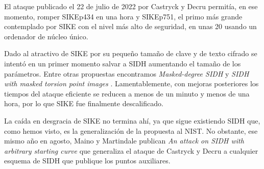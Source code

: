 El ataque publicado el 22 de julio de 2022 por Castryck y Decru \cite{efficient_attack} permitía, en ese momento, romper SIKEp434 en una hora y SIKEp751, el primo más grande contemplado por SIKE con el nivel más alto de seguridad, en unas 20 usando un ordenador de núcleo único. 

Dado al atractivo de SIKE por su pequeño tamaño de clave y de texto cifrado se intentó en un primer momento salvar a SIDH aumentando el tamaño de los parámetros.  Entre otras propuestas encontramos \textit{Masked-degree SIDH} \cite{masked-degree-sidh} y \textit{SIDH with masked torsion point images} \cite{masked-torsion-sidh}. Lamentablemente, con mejoras posteriores los tiempos del ataque eficiente se reducen a menos de un minuto y menos de una hora, por lo que SIKE fue finalmente descalificado.

La caída en desgracia de SIKE no termina ahí, ya que sigue existiendo SIDH que, como hemos visto, es la generalización de la propuesta al NIST. No obstante, ese mismo año en agosto, Maino y Martindale publican \textit{An attack on SIDH with arbitrary starting curve} que generaliza el ataque de Castryck y Decru a cualquier esquema de SIDH que publique los puntos auxiliares.